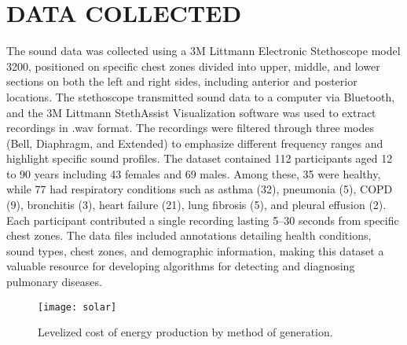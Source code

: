 \documentclass[twocolumn]{article}
\begin{document}
\section{DATA COLLECTED}  
The sound data was collected using a 3M Littmann Electronic Stethoscope model 3200, positioned on specific chest zones divided into upper, middle, and lower sections on both the left and right sides, including anterior and posterior locations. The stethoscope transmitted sound data to a computer via Bluetooth, and the 3M Littmann  StethAssist Visualization software was used to extract recordings in .wav format. The recordings were filtered through three modes (Bell, Diaphragm, and Extended) to emphasize different frequency ranges and highlight specific sound profiles.
The dataset contained 112 participants aged 12 to 90 years including 43 females and 69 males. Among these, 35 were healthy, while 77 had respiratory conditions such as asthma (32), pneumonia (5), COPD (9), bronchitis (3), heart failure (21), lung fibrosis (5), and pleural effusion (2). Each participant contributed a single recording lasting 5–30 seconds from specific chest zones. The data files included annotations detailing health conditions, sound types, chest zones, and demographic information, making this dataset a valuable resource for developing algorithms for detecting and diagnosing pulmonary diseases.

\begin{figure}[h]
  \centering
  \texttt{[image: solar]}
  \caption{Levelized cost of energy production by method of 
  generation. \cite{heart}}
  \label{fig:solar_cheap}
\end{figure}

\cite{telehealth}




\appendix
\end{document}
